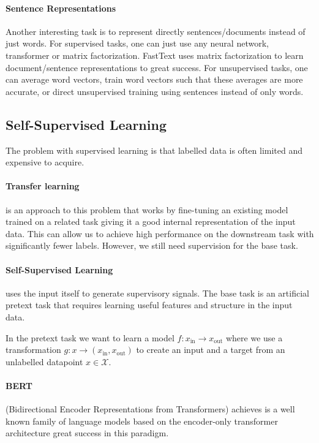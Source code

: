 \documentclass{article}
\begin{document}
\paragraph{Sentence Representations}

Another interesting task is to represent directly sentences/documents instead of just words.
For supervised tasks, one can just use any neural network, transformer or matrix factorization.
FastText uses matrix factorization to learn document/sentence representations to great success.
For unsupervised tasks, one can average word vectors, train word vectors such that these averages are more accurate, or direct unsupervised training using sentences instead of only words.

\subsection{Self-Supervised Learning}

The problem with supervised learning is that labelled data is often limited and expensive to acquire.

\paragraph{Transfer learning} is an approach to this problem that works by fine-tuning an existing model trained on a related task giving it a good internal representation of the input data.
This can allow us to achieve high performance on the downstream task with significantly fewer labels.
However, we still need supervision for the base task.

\paragraph{Self-Supervised Learning} uses the input itself to generate supervisory signals.
The base task is an artificial pretext task that requires learning useful features and structure in the input data.

In the pretext task we want to learn a model $f: x_\text{in} \to x_\text{out}$ where we use a transformation $g : x \to (x_\text{in}, x_\text{out})$ to create an input and a target from an unlabelled datapoint $x \in \mathcal{X}$.

\paragraph{BERT} (Bidirectional Encoder Representations from Transformers) achieves is a well known family of language models based on the encoder-only transformer architecture great success in this paradigm.
\end{document}
